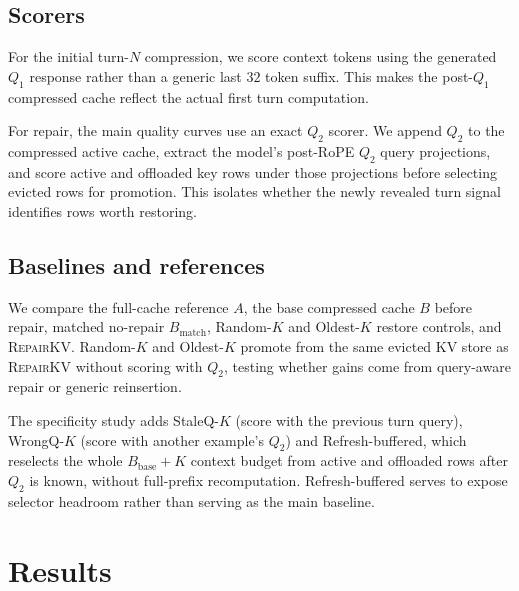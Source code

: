 \documentclass{article}
\newcommand{\repairkv}{\textsc{RepairKV}}
\newcommand{\bbase}{\ensuremath{B_{\mathrm{base}}}}
\newcommand{\bmatch}{\ensuremath{B_{\mathrm{match}}}}
\begin{document}
\subsection{Scorers}
For the initial turn-$N$ compression, we score context tokens using the generated $Q_1$ response rather than a generic last $32$ token suffix. This makes the post-$Q_1$ compressed cache reflect the actual first turn computation.

For repair, the main quality curves use an exact $Q_2$ scorer. We append $Q_2$ to the compressed active cache, extract the model's post-RoPE $Q_2$ query projections, and score active and offloaded key rows under those projections before selecting evicted rows for promotion. This isolates whether the newly revealed turn signal identifies rows worth restoring.

\subsection{Baselines and references}
We compare the full-cache reference $A$, the base compressed cache $B$ before repair, matched no-repair $\bmatch$, Random-$K$ and Oldest-$K$ restore controls, and \repairkv{}. Random-$K$ and Oldest-$K$ promote from the same evicted KV store as \repairkv{} without scoring with $Q_2$, testing whether gains come from query-aware repair or generic reinsertion. 

{\color{red}The specificity study adds StaleQ-$K$ (score with the previous turn query), WrongQ-$K$ (score with another example's $Q_2$) and Refresh-buffered, which reselects the whole $\bbase+K$ context budget from active and offloaded rows after $Q_2$ is known, without full-prefix recomputation. Refresh-buffered serves to expose selector headroom rather than serving as the main baseline.}

\section{Results}
\label{sec:results}
\end{document}
